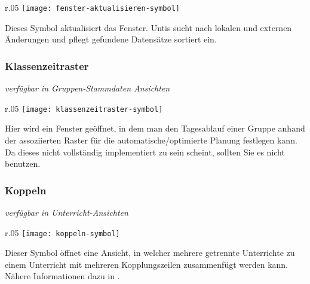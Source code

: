 \begin{wrapfigure}{r}{.05\textwidth}
	\vspace{-50pt}
	\texttt{[image: fenster-aktualisieren-symbol]}
	\vspace{-35pt}
\end{wrapfigure}

\noindent
Dieses Symbol aktualisiert das Fenster. Untis sucht nach lokalen und externen Änderungen und pflegt gefundene Datensätze sortiert ein.\\

\newpage

\subsubsection{Klassenzeitraster}
{\small\textit{verfügbar in Gruppen-Stammdaten Ansichten\\}\par}

\begin{wrapfigure}{r}{.05\textwidth}
	\vspace{-50pt}
	\texttt{[image: klassenzeitraster-symbol]}
	\vspace{-35pt}
\end{wrapfigure}

\noindent
Hier wird ein Fenster geöffnet, in dem man den Tagesablauf einer Gruppe anhand der assoziierten Raster für die automatische/optimierte Planung festlegen kann. Da dieses nicht vollständig implementiert zu sein scheint, sollten Sie es nicht benutzen.\\

\subsubsection{Koppeln}
{\small\textit{verfügbar in Unterricht-Ansichten\\}\par}

\begin{wrapfigure}{r}{.05\textwidth}
	\vspace{-50pt}
	\texttt{[image: koppeln-symbol]}
	\vspace{-35pt}
\end{wrapfigure}

\noindent
Dieser Symbol öffnet eine Ansicht, in welcher mehrere getrennte Unterrichte zu einem Unterricht mit mehreren Kopplungszeilen zusammenfügt werden kann. Nähere Informationen dazu in .\\

